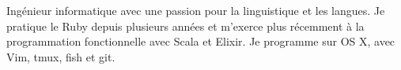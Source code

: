 

\begin{cvparagraph}

Ingénieur informatique avec une passion pour la linguistique et les langues.
Je pratique le Ruby depuis plusieurs années et m'exerce plus récemment à la
programmation fonctionnelle avec Scala et Elixir. Je programme sur OS X, avec
Vim, tmux, fish et git.
\end{cvparagraph}
